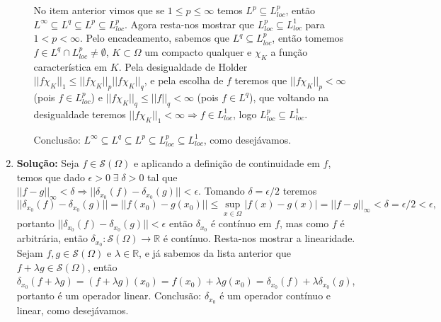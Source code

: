 \documentclass{article}
\begin{document}
\begin{enumerate}
\begin{enumerate}
			No item anterior vimos que se $1 \leq p \leq \infty$ temos $L^{p} \subseteq L^{p}_{loc}$, então $L^{\infty} \subseteq L^{q} \subseteq L^{p} \subseteq L^{p}_{loc}$. Agora resta-nos mostrar que $L^{p}_{loc} \subseteq L^{1}_{loc}$ para $1 < p < \infty$. Pelo encadeamento, sabemos que $L^{q}\subseteq L^{p}_{loc}$, então tomemos $f \in L^{q} \cap L^{p}_{loc} \neq \emptyset$, $K \subset \Omega$ um compacto qualquer e $\chi_{K}$ a função característica em $K$. Pela desigualdade de Holder $||f\chi_{K}||_{1} \leq ||f\chi_{K}||_{p}||f\chi_{K}||_{q}$, e pela escolha de $f$ teremos que $||f\chi_{K}||_{p} < \infty$ (pois $f \in L^{p}_{loc}$) e $||f\chi_{K}||_{q} \leq ||f||_{q} < \infty$ (pois $f \in L^{q}$), que voltando na desigualdade teremos $||f\chi_{K}||_{1} < \infty \Rightarrow f \in L^{1}_{loc}$, logo $L^{p}_{loc} \subseteq L^{1}_{loc}$. 
			
			Conclusão: $L^{\infty} \subseteq L^{q} \subseteq L^{p} \subseteq L^{p}_{loc} \subseteq L^{1}_{loc}$, como desejávamos.
		\end{enumerate}
		
		\item \textbf{Solução:} Seja $f \in \mathcal{S}(\Omega)$ e aplicando a definição de continuidade em $f$, temos que dado $\epsilon >0 \; \exists \; \delta >0$ tal que $||f - g||_{\infty} < \delta\Rightarrow ||\delta_{x_0}(f) - \delta_{x_0}(g)|| < \epsilon$. Tomando $\delta = \epsilon/2$ teremos $$
		||\delta_{x_0}(f) - \delta_{x_0}(g)|| = ||f(x_{0}) - g(x_{0})|| \leq \sup_{x \in \Omega}|f(x) -g(x)| = ||f-g||_{\infty} < \delta = \epsilon/2 < \epsilon,
		$$ 
		portanto $||\delta_{x_0}(f) - \delta_{x_0}(g)||<\epsilon$ então $\delta_{x_0}$ é contínuo em $f$, mas como $f$ é arbitrária, então $\delta_{x_{0}} : \mathcal{S}(\Omega) \to \mathbb{R}$ é contínuo. Resta-nos mostrar a linearidade. Sejam $f, g \in \mathcal{S}(\Omega)$ e $\lambda \in \mathbb{R}$, e já sabemos da lista anterior que $f+\lambda g \in \mathcal{S}(\Omega)$, então $\delta_{x_{0}}(f+\lambda g) = (f+\lambda g)(x_{0}) = f(x_{0})+\lambda g(x_{0}) = \delta_{x_{0}}(f) + \lambda \delta_{x_{0}}(g)$, portanto é um operador linear. Conclusão: $\delta_{x_{0}}$ é um operador contínuo e linear, como desejávamos.
		

\end{enumerate}
\end{document}
